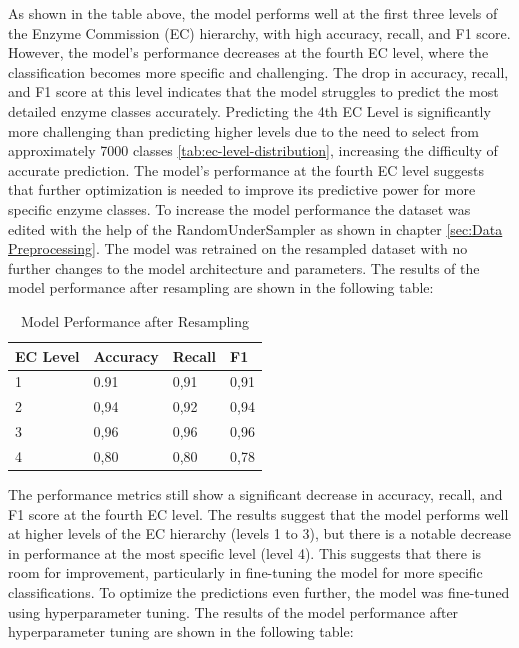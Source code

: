 As shown in the table above, the model performs well at the first three levels of the Enzyme Commission (EC) hierarchy, with high accuracy, recall, and F1 score. However, the model's performance decreases at the fourth EC level, where the classification becomes more specific and challenging. The drop in accuracy, recall, and F1 score at this level indicates that the model struggles to predict the most detailed enzyme classes accurately. Predicting the 4th EC Level is significantly more challenging than predicting higher levels due to the need to select from approximately 7000 classes \ref{tab:ec-level-distribution}, increasing the difficulty of accurate prediction. The model's performance at the fourth EC level suggests that further optimization is needed to improve its predictive power for more specific enzyme classes. To increase the model performance the dataset was edited with the help of the RandomUnderSampler as shown in chapter \ref{sec:Data Preprocessing}. The model was retrained on the resampled dataset with no further changes to the model architecture and parameters. The results of the model performance after resampling are shown in the following table:

\begin{table}[!htbp]
    \centering
    \begin{tabular}{@{}llll@{}}
    \toprule
    \textbf{EC Level} & \textbf{Accuracy} & \textbf{Recall} & \textbf{F1} \\ \midrule
    1                 & 0.91              & 0,91            & 0,91        \\
    2                 & 0,94              & 0,92            & 0,94        \\
    3                 & 0,96              & 0,96            & 0,96        \\
    4                 & 0,80              & 0,80            & 0,78        \\ \bottomrule
    \end{tabular}
    \caption{Model Performance after Resampling}
    \label{tab:performance-after-resampling}
\end{table}

The performance metrics still show a significant decrease in accuracy, recall, and F1 score at the fourth EC level. The results suggest that the model performs well at higher levels of the EC hierarchy (levels 1 to 3), but there is a notable decrease in performance at the most specific level (level 4). This suggests that there is room for improvement, particularly in fine-tuning the model for more specific classifications. To optimize the predictions even further, the model was fine-tuned using hyperparameter tuning. The results of the model performance after hyperparameter tuning are shown in the following table:


